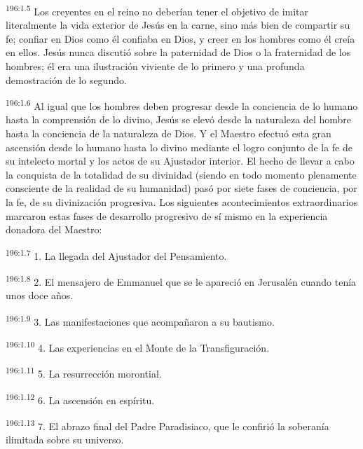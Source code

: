 \par
\textsuperscript{196:1.5} Los creyentes en el reino no deberían tener el objetivo de imitar literalmente la vida exterior de Jesús en la carne, sino más bien de compartir su fe; confiar en Dios como él confiaba en Dios, y creer en los hombres como él creía en ellos. Jesús nunca discutió sobre la paternidad de Dios o la fraternidad de los hombres; él era una ilustración viviente de lo primero y una profunda demostración de lo segundo.

\par
\textsuperscript{196:1.6} Al igual que los hombres deben progresar desde la conciencia de lo humano hasta la comprensión de lo divino, Jesús se elevó desde la naturaleza del hombre hasta la conciencia de la naturaleza de Dios. Y el Maestro efectuó esta gran ascensión desde lo humano hasta lo divino mediante el logro conjunto de la fe de su intelecto mortal y los actos de su Ajustador interior. El hecho de llevar a cabo la conquista de la totalidad de su divinidad (siendo en todo momento plenamente consciente de la realidad de su humanidad) pasó por siete fases de conciencia, por la fe, de su divinización progresiva. Los siguientes acontecimientos extraordinarios marcaron estas fases de desarrollo progresivo de sí mismo en la experiencia donadora del Maestro:

\par
\textsuperscript{196:1.7} 1. La llegada del Ajustador del Pensamiento.

\par
\textsuperscript{196:1.8} 2. El mensajero de Emmanuel que se le apareció en Jerusalén cuando tenía unos doce años.

\par
\textsuperscript{196:1.9} 3. Las manifestaciones que acompañaron a su bautismo.

\par
\textsuperscript{196:1.10} 4. Las experiencias en el Monte de la Transfiguración.

\par
\textsuperscript{196:1.11} 5. La resurrección morontial.

\par
\textsuperscript{196:1.12} 6. La ascensión en espíritu.

\par
\textsuperscript{196:1.13} 7. El abrazo final del Padre Paradisiaco, que le confirió la soberanía ilimitada sobre su universo.

